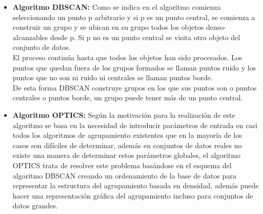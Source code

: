 \begin{itemize} 
\item \textbf{Algoritmo DBSCAN:} Como se indica en \cite{[ESKRISAXU]} el algoritmo comienza seleccionando un punto p arbitrario y si p es un punto central, se comienza a construir un grupo y se ubican en su grupo todos los objetos denso-alcanzables desde p. Si p no es un punto central se visita otro objeto del conjunto de datos.\\
El proceso continúa hasta que todos los objetos han sido procesados. Los puntos que quedan fuera de los grupos formados se llaman puntos ruido y los puntos que no son ni ruido ni centrales se llaman puntos borde.\\
De esta forma DBSCAN construye grupos en los que sus puntos son o puntos centrales o puntos borde, un grupo puede tener más de un punto central. 
\item \textbf{Algoritmo OPTICS:} Según \cite{[ANBRUKRISA]} la motivación para la realización de este algoritmo se basa en la necesidad de introducir parámetros de entrada en casi todos los algoritmos de agrupamiento existentes que en la mayoría de los casos son difíciles de determinar, además en conjuntos de datos reales no existe una manera de determinar estos parámetros globales, el algoritmo OPTICS trata de resolver este problema basándose en el esquema del algoritmo DBSCAN creando un ordenamiento de la base de datos para representar la estructura del agrupamiento basada en densidad, además puede hacer una representación gráfica del agrupamiento incluso para conjuntos de datos grandes.
\end{itemize}